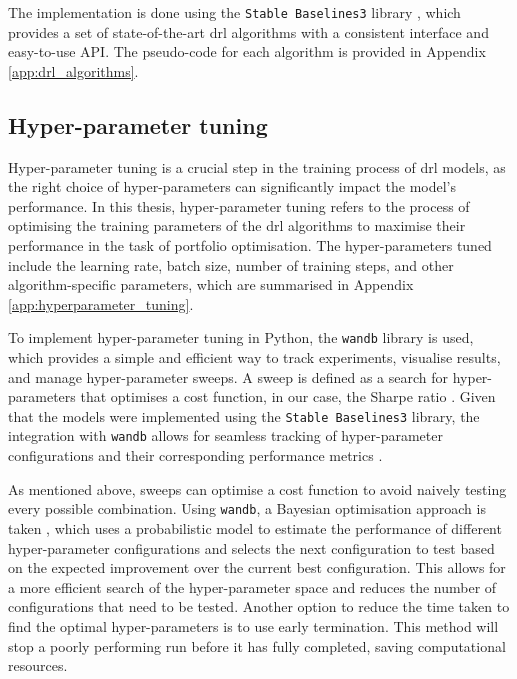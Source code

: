 The implementation is done using the \texttt{Stable Baselines3} library \cite{Raffin2021}, which provides a set of state-of-the-art \acrshort{drl} algorithms with a consistent interface and easy-to-use API. The pseudo-code for each algorithm is provided in Appendix \ref{app:drl_algorithms}.

\subsection{Hyper-parameter tuning} \label{subsec:hyperparameter-tuning}

Hyper-parameter tuning is a crucial step in the training process of \acrshort{drl} models, as the right choice of hyper-parameters can significantly impact the model's performance. In this thesis, hyper-parameter tuning refers to the process of optimising the training parameters of the \acrshort{drl} algorithms to maximise their performance in the task of portfolio optimisation. The hyper-parameters tuned include the learning rate, batch size, number of training steps, and other algorithm-specific parameters, which are summarised in Appendix \ref{app:hyperparameter_tuning}. 

To implement hyper-parameter tuning in Python, the \texttt{wandb} \cite{wandb} library is used, which provides a simple and efficient way to track experiments, visualise results, and manage hyper-parameter sweeps. A sweep is defined as a search for hyper-parameters that optimises a cost function, in our case, the Sharpe ratio \cite{Sharpe1994}. Given that the models were implemented using the \texttt{Stable Baselines3} library, the integration with \texttt{wandb} allows for seamless tracking of hyper-parameter configurations and their corresponding performance metrics \cite{WeightsBiases2025}.

As mentioned above, sweeps can optimise a cost function to avoid naively testing every possible combination. Using \texttt{wandb}, a Bayesian optimisation approach is taken \cite{Falkner2018}, which uses a probabilistic model to estimate the performance of different hyper-parameter configurations and selects the next configuration to test based on the expected improvement over the current best configuration. This allows for a more efficient search of the hyper-parameter space and reduces the number of configurations that need to be tested. Another option to reduce the time taken to find the optimal hyper-parameters is to use early termination. This method will stop a poorly performing run before it has fully completed, saving computational resources.

